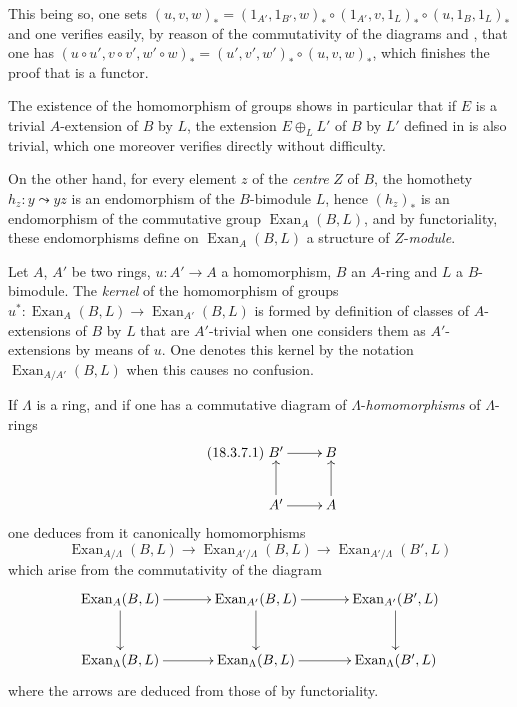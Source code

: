 \begin{env}[18.3.6]
This being so, one sets $(u,v,w)_*=(1_{A'},1_{B'},w)_*\circ(1_{A'},v,1_L)_*\circ(u,1_B,1_L)_*$ and one verifies easily, by reason of the commutativity of the diagrams  and , that one has $(u\circ u',v\circ v',w'\circ w)_*=(u',v',w')_*\circ(u,v,w)_*$, which finishes the proof that  is a functor.

The existence of the homomorphism of groups  shows in particular that if $E$ is a trivial $A$-extension of $B$ by $L$, the extension $E\oplus_L L'$ of $B$ by $L'$ defined in  is also trivial, which one moreover verifies directly without difficulty.

On the other hand, for every element $z$ of the \emph{centre} $Z$ of $B$, the homothety $h_z:y\leadsto yz$ is an endomorphism of the $B$-bimodule $L$, hence $(h_z)_*$ is an endomorphism of the commutative group $\operatorname{Exan}_A(B,L)$, and by functoriality, these endomorphisms define on $\operatorname{Exan}_A(B,L)$ a structure of $Z$-\emph{module}.
\end{env}

\begin{env}[18.3.7]
\label{0.18.3.7}
Let $A$, $A'$ be two rings, $u:A'\to A$ a homomorphism, $B$ an $A$-ring and $L$ a $B$-bimodule.
The \emph{kernel} of the homomorphism of groups $u^*:\operatorname{Exan}_A(B,L)\to\operatorname{Exan}_{A'}(B,L)$
is formed by definition of classes of $A$-extensions of $B$ by $L$ that are $A'$-trivial when one considers them as $A'$-extensions by means of $u$.
One denotes this kernel by the notation $\operatorname{Exan}_{A/A'}(B,L)$ when this causes no confusion.

If $\Lambda$ is a ring, and if one has a commutative diagram of $\Lambda$-\emph{homomorphisms} of $\Lambda$-rings
\begin{equation}
\tag{18.3.7.1}
  \label{0.18.3.7.1}
  \xymatrix{
    B'\ar[r] & B\\
    A'\ar[u]\ar[r] & A\ar[u]
  }
\end{equation}
one deduces from it canonically homomorphisms
\begin{equation}
\tag{18.3.7.2}
  \label{0.18.3.7.2}
  \operatorname{Exan}_{A/\Lambda}(B,L)\to\operatorname{Exan}_{A'/\Lambda}(B,L)\to\operatorname{Exan}_{A'/\Lambda}(B',L)
\end{equation}
which arise from the commutativity of the diagram
\[
  \xymatrix@C=2.8pc@R=2.3pc{
    \operatorname{Exan}_A(B,L)\ar[r]\ar[d]
      & \operatorname{Exan}_{A'}(B,L)\ar[r]\ar[d]
      & \operatorname{Exan}_{A'}(B',L)\ar[d]\\
    \operatorname{Exan}_{\Lambda}(B,L)\ar[r]
      & \operatorname{Exan}_{\Lambda}(B,L)\ar[r]
      & \operatorname{Exan}_{\Lambda}(B',L)
  }
\]
where the arrows are deduced from those of  by functoriality.
\end{env}

